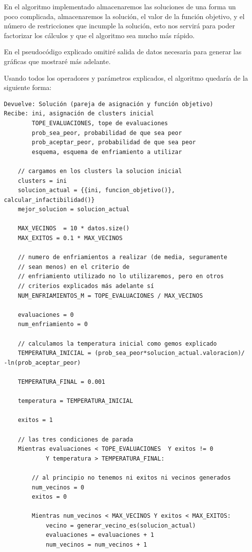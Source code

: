 \documentclass[12pt, spanish]{article}
\begin{document}
En el algoritmo implementado almacenaremos las soluciones de una forma un poco complicada, almacenaremos la solución, el valor de la función objetivo, y el número de restricciones que incumple la solución, esto nos servirá para poder factorizar los cálculos y que el algoritmo sea mucho más rápido.

En el pseudocódigo explicado omitiré salida de datos necesaria para generar las gráficas que mostraré más adelante.

Usando todos los operadores y parámetros explicados, el algoritmo quedaría de la siguiente forma:

\begin{lstlisting}
Devuelve: Solución (pareja de asignación y función objetivo)
Recibe: ini, asignación de clusters inicial
		TOPE_EVALUACIONES, tope de evaluaciones 
		prob_sea_peor, probabilidad de que sea peor 
		prob_aceptar_peor, probabilidad de que sea peor 
		esquema, esquema de enfriamiento a utilizar
		
	// cargamos en los clusters la solucion inicial
	clusters = ini		
	solucion_actual = {{ini, funcion_objetivo()}, calcular_infactibilidad()}
	mejor_solucion = solucion_actual
	
	MAX_VECINOS  = 10 * datos.size()
	MAX_EXITOS = 0.1 * MAX_VECINOS
	
	// numero de enfriamientos a realizar (de media, seguramente 
	// sean menos) en el criterio de
	// enfriamiento utilizado no lo utilizaremos, pero en otros
	// criterios explicados más adelante sí
	NUM_ENFRIAMIENTOS_M = TOPE_EVALUACIONES / MAX_VECINOS
	
	evaluaciones = 0
	num_enfriamiento = 0
	
	// calculamos la temperatura inicial como gemos explicado
	TEMPERATURA_INICIAL = (prob_sea_peor*solucion_actual.valoracion)/ -ln(prob_aceptar_peor)

	TEMPERATURA_FINAL = 0.001
	
	temperatura = TEMPERATURA_INICIAL
	
	exitos = 1
	
	// las tres condiciones de parada
	Mientras evaluaciones < TOPE_EVALUACIONES  Y exitos != 0 
			Y temperatura > TEMPERATURA_FINAL:
	
		// al principio no tenemos ni exitos ni vecinos generados
		num_vecinos = 0
		exitos = 0
		
		Mientras num_vecinos < MAX_VECINOS Y exitos < MAX_EXITOS:
			vecino = generar_vecino_es(solucion_actual)
			evaluaciones = evaluaciones + 1
			num_vecinos = num_vecinos + 1
			

\end{lstlisting}
\end{document}
